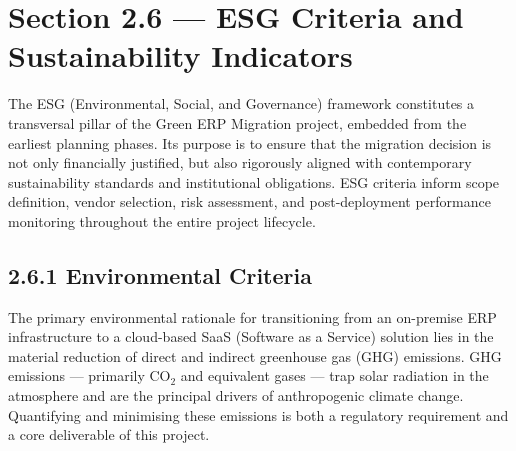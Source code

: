 

\chapter{Section 2.6 --- ESG Criteria and Sustainability Indicators}

The ESG (Environmental, Social, and Governance) framework constitutes a
transversal pillar of the Green ERP Migration project, embedded from the
earliest planning phases. Its purpose is to ensure that the migration
decision is not only financially justified, but also rigorously aligned with
contemporary sustainability standards and institutional obligations. ESG
criteria inform scope definition, vendor selection, risk assessment, and
post-deployment performance monitoring throughout the entire project
lifecycle.

\section{2.6.1 Environmental Criteria}

The primary environmental rationale for transitioning from an on-premise ERP
infrastructure to a cloud-based SaaS (Software as a Service) solution lies
in the material reduction of direct and indirect greenhouse gas (GHG)
emissions. GHG emissions --- primarily CO$_2$ and equivalent gases --- trap
solar radiation in the atmosphere and are the principal drivers of
anthropogenic climate change. Quantifying and minimising these emissions is
both a regulatory requirement and a core deliverable of this project.

